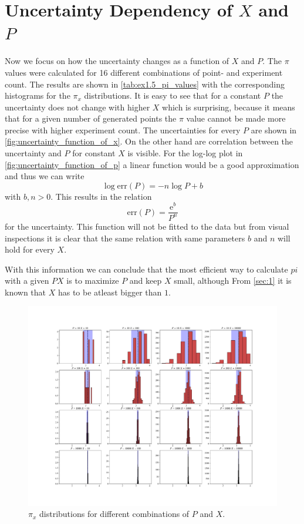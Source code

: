 \section{Uncertainty Dependency of $X$ and $P$}\label{sec:3}
Now we focus on how the uncertainty changes as a function of $X$ and $P$.
The $\pi$ values were calculated for 16 different combinations of point- and
experiment count. The results are shown in \cref{tab:ex1.5_pi_values} with
the corresponding histograms for the $\pi_x$ distributions.
It is easy to see that for a constant $P$ the uncertainty does not
change with higher $X$ which is surprising, because it means that for a
given number of generated points the $\pi$ value cannot be made
more precise with higher experiment count. The uncertainties for every
$P$ are shown in \cref{fig:uncertainty_function_of_x}. On the other hand
are correlation between the uncertainty and $P$ for constant $X$
is visible. For the log-log plot in \cref{fig:uncertainty_function_of_p} a linear
function would be a good approximation and thus we can write
$$ \log \text{err}(P) = -n\log P + b$$
with $b, n > 0$. This results in the relation
$$\text{err}(P) = \frac{\mathrm{e}^b}{P^n}$$
for the uncertainty. This function will not be fitted to the data but from visual
inspections it is clear that the same relation with same parameters $b$ and $n$
will hold for every $X$. \par
With this information we can conclude that the most efficient way to calculate
$pi$ with a given $PX$ is to maximize $P$ and keep $X$ small, although From
\cref{sec:1} it is known that $X$ has to be atleast bigger than $1$.



\begin{figure}[htb]
	\centering
	\includegraphics[width=1\linewidth]{figs/ex1.5_px_combinations.pdf}
	\caption{$\pi_x$ distributions for different combinations of $P$ and $X$.}
	\label{fig:px_combinations}
\end{figure}

